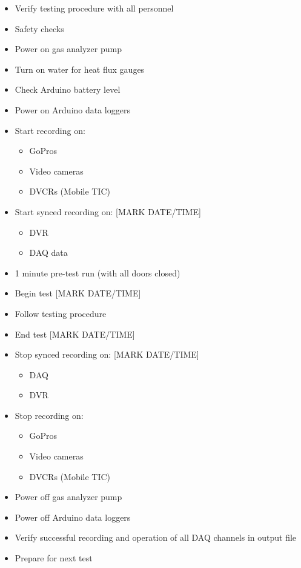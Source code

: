 \documentclass[11pt,oneside]{book}
\begin{document}
\begin{itemize}
\item Verify testing procedure with all personnel
\item Safety checks

\item Power on gas analyzer pump

\item Turn on water for heat flux gauges

\item Check Arduino battery level
\item Power on Arduino data loggers

\item Start recording on:
    \begin{itemize}
    \item GoPros
    \item Video cameras
    \item DVCRs (Mobile TIC)
    \end{itemize}

\item Start synced recording on: [MARK DATE/TIME]
    \begin{itemize}
    \item DVR
    \item DAQ data
    \end{itemize}

\item 1 minute pre-test run (with all doors closed)

\item Begin test [MARK DATE/TIME]

\item Follow testing procedure

\item End test [MARK DATE/TIME]

\item Stop synced recording on: [MARK DATE/TIME]
    \begin{itemize}
    \item DAQ
    \item DVR
    \end{itemize}

\item Stop recording on:
    \begin{itemize}
    \item GoPros
    \item Video cameras
    \item DVCRs (Mobile TIC)
    \end{itemize}

\item Power off gas analyzer pump

\item Power off Arduino data loggers

\item Verify successful recording and operation of all DAQ channels in output file

\item Prepare for next test
\end{itemize}
\end{document}
